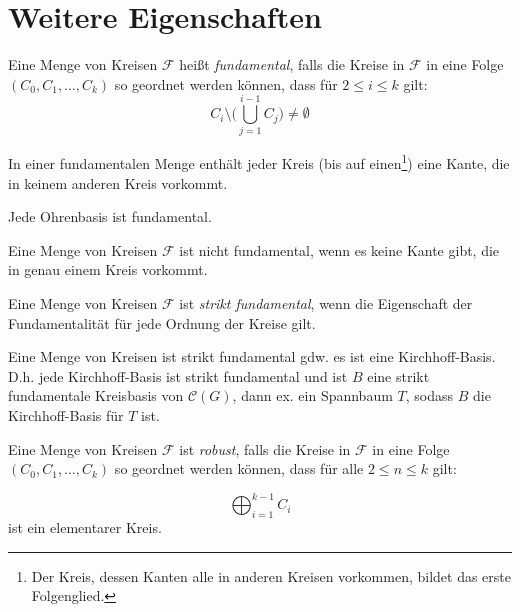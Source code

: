 \section{Weitere Eigenschaften}

\begin{definition}[Fundamental]
    Eine Menge von Kreisen $ \mathcal{F} $ heißt \textit{fundamental}, falls die Kreise in $ \mathcal{F} $ in eine Folge $ (C_0, C_1, \dots, C_k) $ so geordnet werden können, dass für $ 2 \leq i \leq k $ gilt:
    \begin{equation*}
        C_i \setminus \big(\bigcup^{i-1}_{j=1} C_j \big) \ne \emptyset
    \end{equation*}
\end{definition}

\begin{remark}
    In einer fundamentalen Menge enthält jeder Kreis (bis auf einen\footnote{%
        Der Kreis, dessen Kanten alle in anderen Kreisen vorkommen, bildet das erste Folgenglied.
    }) eine Kante, die in keinem anderen Kreis vorkommt.
\end{remark}

\begin{proposition}
    Jede Ohrenbasis ist fundamental.
\end{proposition}

\begin{lemma}
    Eine Menge von Kreisen $ \mathcal{F} $ ist nicht fundamental, wenn es keine Kante gibt, die in genau einem Kreis vorkommt.
\end{lemma}

\begin{definition}
    Eine Menge von Kreisen $ \mathcal{F} $ ist \textit{strikt fundamental}, wenn die Eigenschaft der Fundamentalität für jede Ordnung der Kreise gilt.
\end{definition}

\begin{proposition}
    Eine Menge von Kreisen ist strikt fundamental gdw. es ist eine Kirchhoff-Basis.
    D.h. jede Kirchhoff-Basis ist strikt fundamental und ist $ B $ eine strikt fundamentale Kreisbasis von $ \mathcal{C}(G) $, dann ex. ein Spannbaum $ T $, sodass $ B $ die Kirchhoff-Basis für $ T $ ist.
\end{proposition}

\begin{definition}[Robust]
    Eine Menge von Kreisen $ \mathcal{F} $ ist \textit{robust}, falls die Kreise in $ \mathcal{F} $ in eine Folge $ (C_0, C_1, \dots, C_k) $ so geordnet werden können, dass für alle $ 2 \leq n \leq k $ gilt:

    \begin{equation*}
        \bigoplus^{k-1}_{i=1} C_i
    \end{equation*}
    ist ein elementarer Kreis.
\end{definition}

